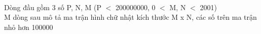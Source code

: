\\   Dòng đầu gồm 3 số P, N, M (P $<$ 200000000, 0 $<$ M, N $<$ 2001)   
\\   M dòng sau mô tả ma trận hình chữ nhật kích thước M x N, các số trên ma trận nhỏ hơn 100000